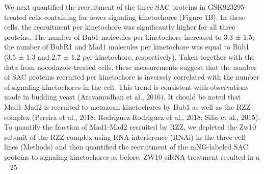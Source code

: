 We next quantified the recruitment of the three SAC proteins in GSK923295-treated cells containing far fewer signaling kinetochores (Figure 1B). In these cells, the recruitment per kinetochore was significantly higher for all three proteins. The number of Bub1 molecules per kinetochore increased to 3.3 ± 1.5; the number of BubR1 and Mad1 molecules per kinetochore was equal to Bub1 (3.5 ± 1.3 and 2.7 ± 1.2 per kinetochore, respectively). Taken together with the data from nocodazole-treated cells, these measurements suggest that the number of SAC proteins recruited per kinetochore is inversely correlated with the number of signaling kinetochores in the cell. This trend is consistent with observations made in budding yeast (Aravamudhan et al., 2016). 
It should be noted that Mad1-Mad2 is recruited to metazoan kinetochores by Bub1 as well as the RZZ complex (Pereira et al., 2018; Rodriguez-Rodriguez et al., 2018; Silio et al., 2015). To quantify the fraction of Mad1-Mad2 recruited by RZZ, we depleted the Zw10 subunit of the RZZ complex using RNA interference (RNAi) in the three cell lines (Methods) and then quantified the recruitment of the mNG-labeled SAC proteins to signaling kinetochores as before. ZW10 siRNA treatment resulted in a ~ 25%

